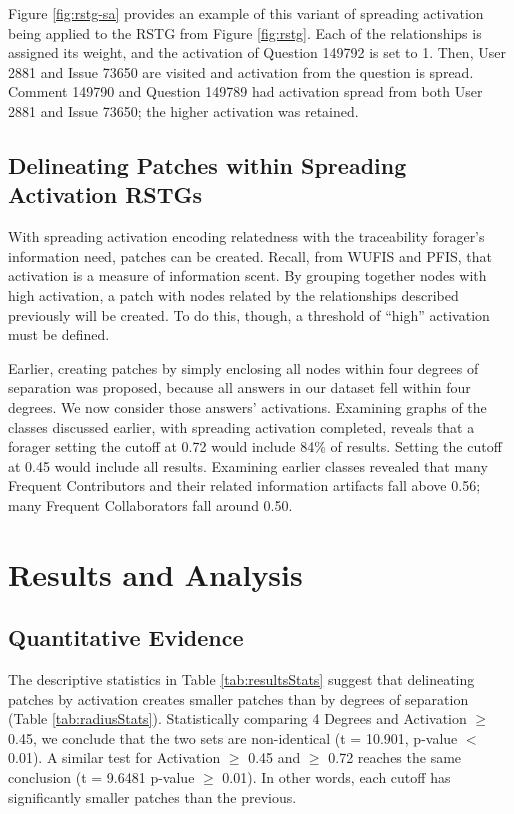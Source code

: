 \documentclass[conference]{IEEEtran}
\begin{document}
Figure \ref{fig:rstg-sa} provides an example of this variant of spreading activation being applied to the RSTG from Figure \ref{fig:rstg}. Each of the relationships is assigned its weight, and the activation of Question 149792 is set to 1. Then, User 2881 and Issue 73650 are visited and activation from the question is spread. Comment 149790 and Question 149789 had activation spread from both User 2881 and Issue 73650; the higher activation was retained. 

\subsection{Delineating Patches within Spreading Activation RSTGs}
With spreading activation encoding relatedness with the traceability forager's information need, patches can be created. Recall, from WUFIS and PFIS, that activation is a measure of information scent. By grouping together nodes with high activation, a patch with nodes related by the relationships described previously will be created. To do this, though, a threshold of ``high'' activation must be defined.

Earlier, creating patches by simply enclosing all nodes within four degrees of separation was proposed, because all answers in our dataset fell within four degrees. We now consider those answers' activations. Examining graphs of the classes discussed earlier, with spreading activation completed, reveals that a forager setting the cutoff at 0.72 would include 84\% of results. Setting the cutoff at 0.45 would include all results. Examining earlier classes revealed that many Frequent Contributors and their related information artifacts fall above 0.56; many Frequent Collaborators fall around 0.50.

\section{Results and Analysis}
\subsection{Quantitative Evidence}
The descriptive statistics in Table \ref{tab:resultsStats} suggest that delineating patches by activation creates smaller patches than by degrees of separation (Table \ref{tab:radiusStats}). Statistically comparing 4 Degrees and Activation $\geq$ 0.45, we conclude that the two sets are non-identical (t = 10.901, p-value $<$ 0.01). A similar test for Activation $\geq$ 0.45 and $\geq$ 0.72 reaches the same conclusion (t = 9.6481 p-value $\geq$ 0.01). In other words, each cutoff has significantly smaller patches than the previous. 
\end{document}
